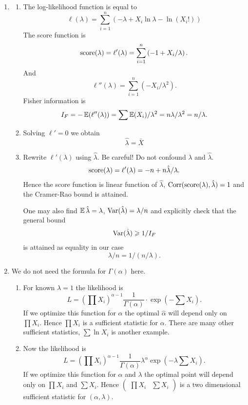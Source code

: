 \begin{enumerate}
\item 
\begin{enumerate}
\item The log-likelihood function is equal to
\[
\ell(\lambda) = \sum_{i=1}^n \left( -\lambda + X_i \ln \lambda - \ln (X_i!)\right)    
\]
The score function is 
\[
\mathrm{score}(\lambda) = \ell'(\lambda) = \sum_{i=1}^n \left( -1 + X_i / \lambda\right).
\]
And
\[
\ell''(\lambda) = \sum_{i=1}^n \left(- X_i / \lambda^2 \right).
\]
Fisher information is 
\[
I_F = -\operatorname{\mathbb{E}}(\ell''(\lambda)) = \sum \operatorname{\mathbb{E}}(X_i) / \lambda^2 = n\lambda / \lambda^2 = n/\lambda.    
\]

\item Solving $\ell' = 0$ we obtain 
\[
\hat \lambda = \bar X    
\] 

\item Rewrite $\ell'(\lambda)$ using $\hat\lambda$. 
Be careful! Do not confound $\lambda$ and $\hat\lambda$. 
\[
\mathrm{score}(\lambda) = \ell'(\lambda) = -n + n \hat \lambda / \lambda.
\]
Hence the score function is linear function of $\hat\lambda$, $\operatorname{Corr}(\mathrm{score}(\lambda), \hat\lambda) = 1$
and the Cramer-Rao bound is attained. 

One may also  find $\operatorname{\mathbb{E}} \hat \lambda = \lambda$, $\operatorname{Var}(\hat \lambda) = \lambda / n$ and
explicitly check that the general bound
\[
\operatorname{Var}(\hat \lambda) \geqslant 1/ I_F 
\]
is attained as equality in our case
\[
    \lambda / n = 1/(n/\lambda). 
\]


\end{enumerate}

\item We do not need the formula for $\Gamma(\alpha)$ here. 
\begin{enumerate}
    \item For known $\lambda = 1$ the likelihood is 
    \[
    L = \left(\prod X_i \right)^{\alpha - 1} \frac{1}{\Gamma(\alpha)} \cdot \exp( - \sum X_i).
    \]
    If we optimize this function for $\alpha$ the optimal $\hat\alpha$ will depend only on $\prod X_i$.
    Hence $\prod X_i$ is a sufficient statistic for $\alpha$. 
    There are many other sufficient statistics, $\sum \ln X_i$ is another example. 
    \item Now the likelihood is 
    \[
    L = \left(\prod X_i \right)^{\alpha - 1} \frac{1}{\Gamma(\alpha)} \lambda^{\alpha }\exp( - \lambda \sum X_i).
    \]
    If we optimize this function for $\alpha$ and $\lambda$ the optimal point will depend only on $\prod X_i$ and $\sum X_i$.
    Hence $\begin{pmatrix}
        \prod X_i & \sum X_i 
    \end{pmatrix}$ is a two dimensional sufficient statistic for $(\alpha, \lambda)$.
    

\end{enumerate}
\end{enumerate}

